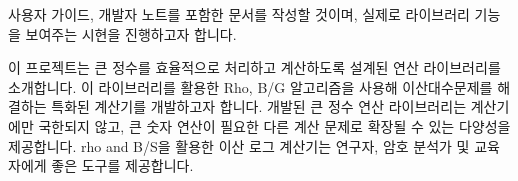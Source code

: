 \documentclass[12pt,a4paper]{article}
\begin{document}
	사용자 가이드, 개발자 노트를 포함한 문서를 작성할 것이며, 실제로 라이브러리 기능을 보여주는 시현을 진행하고자 합니다.
	
	이 프로젝트는 큰 정수를 효율적으로 처리하고 계산하도록 설계된 연산 라이브러리를 소개합니다. 이 라이브러리를 활용한 Rho, B/G  알고리즘을 사용해 이산대수문제를 해결하는 특화된 계산기를 개발하고자 합니다. 
	개발된 큰 정수 연산 라이브러리는 계산기에만 국한되지 않고, 큰 숫자 연산이 필요한 다른 계산 문제로 확장될 수 있는 다양성을 제공합니다. rho and B/S을 활용한 이산 로그 계산기는 연구자, 암호 분석가 및 교육자에게 좋은  도구를 제공합니다.
	
\end{document}
